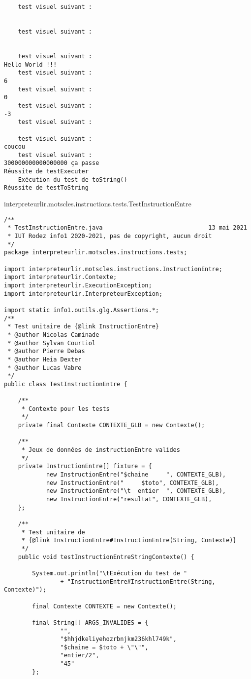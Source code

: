 \begin{enum}
\begin{verbatim}
    test visuel suivant : 


    test visuel suivant : 


    test visuel suivant : 
Hello World !!!
    test visuel suivant : 
6
    test visuel suivant : 
0
    test visuel suivant : 
-3
    test visuel suivant : 

    test visuel suivant : 
coucou
    test visuel suivant : 
300000000000000000 ça passe
Réussite de testExecuter
    Exécution du test de toString()
Réussite de testToString
\end{verbatim}

    \item interpreteurlir.motscles.instructions.tests.TestInstructionEntre
\begin{verbatim}
/**
 * TestInstructionEntre.java                              13 mai 2021
 * IUT Rodez info1 2020-2021, pas de copyright, aucun droit
 */
package interpreteurlir.motscles.instructions.tests;

import interpreteurlir.motscles.instructions.InstructionEntre;
import interpreteurlir.Contexte;
import interpreteurlir.ExecutionException;
import interpreteurlir.InterpreteurException;

import static info1.outils.glg.Assertions.*;
/** 
 * Test unitaire de {@link InstructionEntre}
 * @author Nicolas Caminade
 * @author Sylvan Courtiol
 * @author Pierre Debas
 * @author Heia Dexter
 * @author Lucas Vabre
 */
public class TestInstructionEntre {
    
    /**
     * Contexte pour les tests
     */
    private final Contexte CONTEXTE_GLB = new Contexte();
    
    /**
     * Jeux de données de instructionEntre valides
     */
    private InstructionEntre[] fixture = { 
            new InstructionEntre("$chaine     ", CONTEXTE_GLB),
            new InstructionEntre("     $toto", CONTEXTE_GLB),
            new InstructionEntre("\t  entier  ", CONTEXTE_GLB),
            new InstructionEntre("resultat", CONTEXTE_GLB),
    };

    /** 
     * Test unitaire de 
     * {@link InstructionEntre#InstructionEntre(String, Contexte)}
     */
    public void testInstructionEntreStringContexte() {
        
        System.out.println("\tExécution du test de "
                + "InstructionEntre#InstructionEntre(String, Contexte)");
        
        final Contexte CONTEXTE = new Contexte();
        
        final String[] ARGS_INVALIDES = { 
                "", 
                "$hhjdkeliyehozrbnjkm236khl749k",
                "$chaine = $toto + \"\"",
                "entier/2",
                "45"
        };
        

\end{verbatim}
\end{enum}
